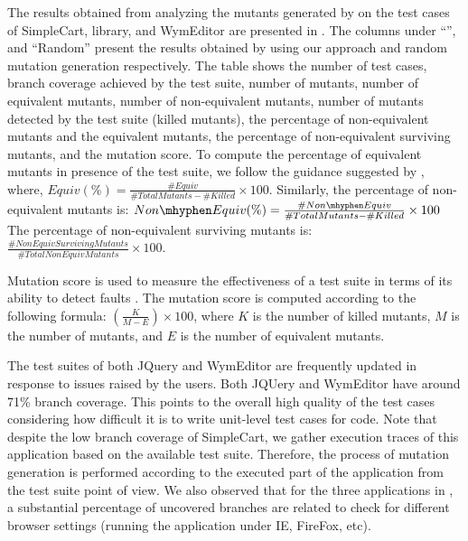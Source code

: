 

The results obtained from analyzing the mutants generated by \mutandis on the test cases of SimpleCart, \jquery library, and WymEditor are presented in . The columns under ``\mutandis'', and ``Random'' present the results obtained by using our approach and random mutation generation respectively. The table shows the number of test cases, branch coverage achieved by the test suite, number of mutants, number of equivalent mutants, number of non-equivalent mutants, number of mutants detected by the test suite (killed mutants), 
the percentage of non-equivalent mutants and the equivalent mutants, 
the percentage of non-equivalent surviving mutants, and the mutation score.
To compute the percentage of equivalent mutants in presence of the test suite, we follow the guidance suggested by \cite{schuler:tvr12}, where, $Equiv (\%)=\frac{\#Equiv}{\#TotalMutants-\#Killed} \times 100$. 
Similarly, the percentage of non-equivalent mutants is: $Non\mhyphen Equiv (\%)=\frac{\#Non\mhyphen Equiv}{\#TotalMutants-\#Killed} \times 100$
The percentage of non-equivalent surviving mutants is: $\frac{\#NonEquivSurvivingMutants}{\#TotalNonEquivMutants} \times 100$.

Mutation score is used to measure the effectiveness of a test suite in terms of its ability
to detect faults \cite{woodward:ist93}. The mutation score is computed according to the following formula: 
$\left(\frac{K}{M-E}\right) \times 100$, where $K$ is the number of killed mutants, $M$ is the  number of mutants, and $E$ is the number of equivalent mutants.    

 The test suites of both JQuery and WymEditor are frequently updated in response to issues raised by the users. Both JQUery and WymEditor have around 71\% branch coverage. This points to the overall high quality of the test cases considering how difficult it is to write unit-level test cases for \javascript code. 
Note that despite the low branch coverage of SimpleCart, we gather execution traces of this application based on the available test suite. Therefore, the process of mutation generation is performed according to the executed part of the application from the test suite point of view. We also observed that for the three applications in , a substantial percentage of uncovered branches are related to check for different browser settings (\ie running the application under IE, FireFox, etc).

